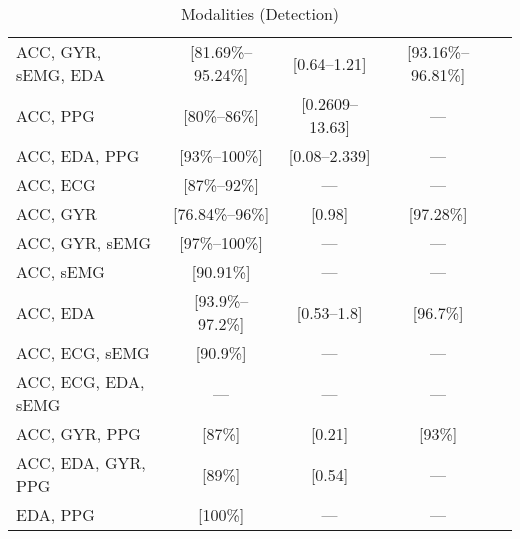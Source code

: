 
\begin{table}
    \caption{Modalities (Detection)}
    \vspace{1em}
    \label{tab:modalities}
    \footnotesize
\begin{tabularx}{\textwidth}{@{}lCCCC@{}}
\toprule
{} &  &  &  &  \\
\midrule
ACC, GYR, sEMG, EDA & [81.69\%--95.24\%] & [0.64--1.21] & [93.16\%--96.81\%] & \cite{Wang2025-ql, Ge2023-ab, Li2022-ty, Wu2024-yl, Wang2022-lt} \\
ACC, PPG & [80\%--86\%] & [0.2609--13.63] & --- & \cite{Ali2020-ke, Tang2021-td, Arends2018-ew, Yu2023-ss} \\
ACC, EDA, PPG & [93\%--100\%] & [0.08--2.339] & --- & \cite{Xu2022-tx, Nasseri2021-xn} \\
ACC, ECG & [87\%--92\%] & --- & --- & \cite{Van_Andel2017-yx, Hegarty-Craver2021-hk} \\
ACC, GYR & [76.84\%--96\%] & [0.98] & [97.28\%] & \cite{Larsen2024-vn, Dong2022-oo} \\
ACC, GYR, sEMG & [97\%--100\%] & --- & --- & \cite{Wang2025-my, Gheryani2017-yg} \\
ACC, sEMG & [90.91\%] & --- & --- & \cite{Milosevic2016-ee} \\
ACC, EDA & [93.9\%--97.2\%] & [0.53--1.8] & [96.7\%] & \cite{Regalia2019-ch, Poh2012-af, Chowdhury2022-bi} \\
ACC, ECG, sEMG & [90.9\%] & --- & --- & \cite{De_Cooman2018-pq} \\
ACC, ECG, EDA, sEMG & --- & --- & --- & \cite{Hamlin2021-sd} \\
ACC, GYR, PPG & [87\%] & [0.21] & [93\%] & \cite{Vakilna2024-hk} \\
ACC, EDA, GYR, PPG & [89\%] & [0.54] & --- & \cite{Jiang2022-zu} \\
EDA, PPG & [100\%] & --- & --- & \cite{Cogan2017-lg} \\
\bottomrule
\end{tabularx}

\end{table}